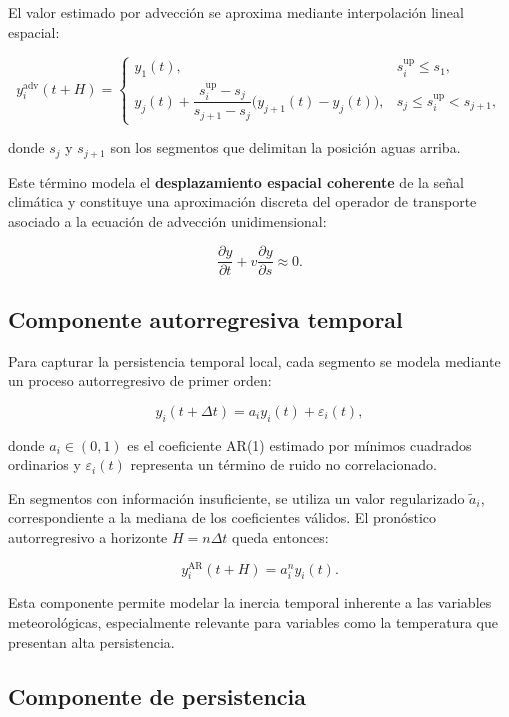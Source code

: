 \documentclass[
  spanish,
  us-letterpaper,
]{scrreprt}
\numberwithin{equation}{section}
\begin{document}
El valor estimado por advección se aproxima mediante interpolación
lineal espacial:

\[
y_i^{\text{adv}}(t+H) =
\begin{cases}
y_1(t), & s_i^{\text{up}} \le s_1, \\[6pt]
y_j(t) + \dfrac{s_i^{\text{up}} - s_j}{s_{j+1}-s_j}\bigl(y_{j+1}(t)-y_j(t)\bigr), & s_j \le s_i^{\text{up}} < s_{j+1},
\end{cases}
\]

donde \(s_j\) y \(s_{j+1}\) son los segmentos que delimitan la posición
aguas arriba.

Este término modela el \textbf{desplazamiento espacial coherente} de la
señal climática y constituye una aproximación discreta del operador de
transporte asociado a la ecuación de advección unidimensional:

\[
\frac{\partial y}{\partial t} + v \frac{\partial y}{\partial s} \approx 0.
\]

\subsection{Componente autorregresiva
temporal}\label{componente-autorregresiva-temporal}

Para capturar la persistencia temporal local, cada segmento se modela
mediante un proceso autorregresivo de primer orden:

\[
y_i(t+\Delta t) = a_i y_i(t) + \varepsilon_i(t),
\]

donde \(a_i \in (0,1)\) es el coeficiente AR(1) estimado por mínimos
cuadrados ordinarios y \(\varepsilon_i(t)\) representa un término de
ruido no correlacionado.

En segmentos con información insuficiente, se utiliza un valor
regularizado \(\tilde{a}_i\), correspondiente a la mediana de los
coeficientes válidos. El pronóstico autorregresivo a horizonte
\(H = n\Delta t\) queda entonces:

\[
y_i^{\text{AR}}(t+H) = a_i^{n} y_i(t). \tag{4.3}
\]

Esta componente permite modelar la inercia temporal inherente a las
variables meteorológicas, especialmente relevante para variables como la
temperatura que presentan alta persistencia.

\subsection{Componente de
persistencia}\label{componente-de-persistencia}
\end{document}

